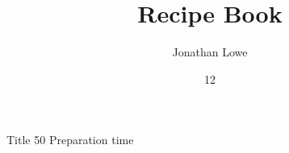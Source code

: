 \documentclass[12pt]{article}
\title{Recipe Book}
\author{Jonathan Lowe}
\date{12\-16\-2018}
\begin{document}
\maketitle

\begin{recipe}{Title} {50 } {Preparation time}
\end{recipe}
\end{document}
